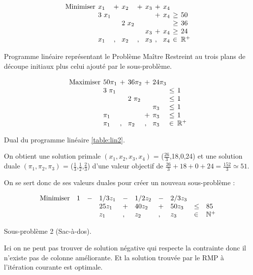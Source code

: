 \begin{table}[H]
\centering
\begin{minipage}[t]{0.4\linewidth}
$$
\arraycolsep=2pt
\begin{array}{*{10}l}
\text{Minimiser} & x_1 & + & x_2 & + & x_3 & + & x_4\\
& 3~x_1 & & & & & + & x_4 & \geq & 50\\
&  & & 2~x_2 & & &  & & \geq & 36 \\
& & & & & x_3 & + & x_4 & \geq & 24\\
&x_1 &, &x_2&, & x_3 & , & x_4 & \in & \mathbb{R}^+
\end{array}
$$
\caption{Programme linéaire représentant le Problème Maître Restreint au trois plans de découpe initiaux plus celui ajouté par le sous-problème.\label{table:lin2}}
\end{minipage}
\hspace{1cm}
\begin{minipage}[t]{0.4\linewidth}
$$
\arraycolsep=2pt
\begin{array}{*8l}
\text{Maximiser} & 50\pi_1 & + & 36\pi_2 & + & 24\pi_3 & &\\
& 3~\pi_1 & &  & & & \leq & 1\\
&  & &2~\pi_2  & &  & \leq & 1\\
& & &  & & \pi_3 & \leq & 1\\
& \pi_1 & &  & + & \pi_3 & \leq & 1\\
& \pi_1 & ,& \pi_2 & , & \pi_3 & \in & \mathbb{R}^{+}
\end{array}
$$
\caption{Dual du programme linéaire \ref{table:lin2}.\label{table:dual2}}
\end{minipage}
\hfill
\end{table}

On obtient une solution primale $(x_1,x_2,x_3,x_4)$ = ($\frac{26}{3}$,18,0,24) et une solution duale $(\pi_1,\pi_2,\pi_3) $ = ($\frac{1}{3}$,$\frac{1}{2}$,$\frac{2}{3}$) d'une valeur objectif de $\frac{26}{3} + 18 + 0 + 24 = \frac{152}{3} \simeq 51$. 

On se sert donc de ses valeurs duales pour créer un nouveau sous-problème :\\

\begin{table}[H]
\centering
$$
\begin{array}{*{10}l}
\text{Minimiser} & 1 & - &1/3z_1 & - & 1/2z_2 & - & 2/3z_3\\
& & &25z_1 & + & 40z_2 & + & 50z_3 & \leq & 85\\
& & &z_1 &,&z_2&,&z_3& \in&\mathbb{N}^+
\end{array}
$$
\caption{Sous-problème 2 (Sac-à-dos). \label{table:psp2}}
\end{table}

Ici on ne peut pas trouver de solution négative qui respecte la contrainte donc il n'existe pas de colonne améliorante. Et la solution trouvée par le RMP à l'itération courante est optimale.